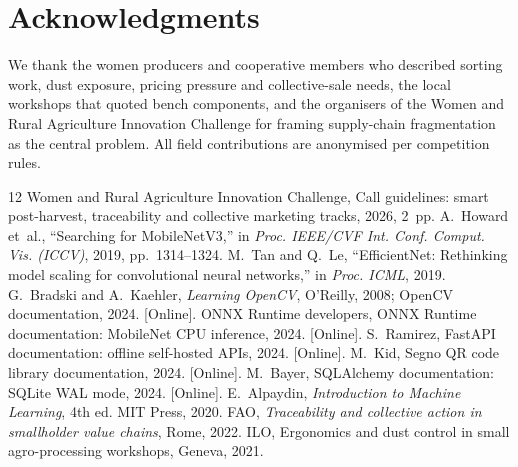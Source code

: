 \documentclass[10pt,conference,a4paper]{IEEEtran}
\begin{document}
\section*{Acknowledgments}
We thank the women producers and cooperative members who described sorting work, dust exposure, pricing pressure and collective-sale needs, the local workshops that quoted bench components, and the organisers of the Women and Rural Agriculture Innovation Challenge for framing supply-chain fragmentation as the central problem. All field contributions are anonymised per competition rules.
\begin{thebibliography}{12}
 Women and Rural Agriculture Innovation Challenge, Call guidelines: smart post-harvest, traceability and collective marketing tracks, 2026, 2~pp.
 A.~Howard et~al., ``Searching for MobileNetV3,'' in \textit{Proc. IEEE/CVF Int. Conf. Comput. Vis. (ICCV)}, 2019, pp.~1314--1324.
 M.~Tan and Q.~Le, ``EfficientNet: Rethinking model scaling for convolutional neural networks,'' in \textit{Proc. ICML}, 2019.
 G.~Bradski and A.~Kaehler, \textit{Learning OpenCV}, O'Reilly, 2008; OpenCV documentation, 2024. [Online].
 ONNX Runtime developers, ONNX Runtime documentation: MobileNet CPU inference, 2024. [Online].
 S.~Ramirez, FastAPI documentation: offline self-hosted APIs, 2024. [Online].
 M.~Kid, Segno QR code library documentation, 2024. [Online].
 M.~Bayer, SQLAlchemy documentation: SQLite WAL mode, 2024. [Online].
 E.~Alpaydin, \textit{Introduction to Machine Learning}, 4th ed. MIT Press, 2020.
 FAO, \textit{Traceability and collective action in smallholder value chains}, Rome, 2022.
 ILO, Ergonomics and dust control in small agro-processing workshops, Geneva, 2021.
\end{thebibliography}
\end{document}
